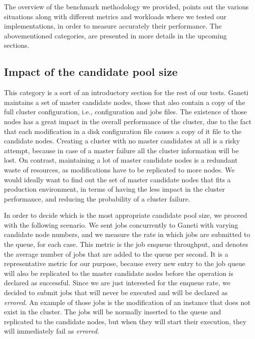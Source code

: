 The overview of the benchmark methodology we provided, points out the various
situations along with different metrics and workloads where we tested our
implementations, in order to measure accurately their performance. The
abovementioned categories, are presented in more details in the upcoming
sections.

\subsection{Impact of the candidate pool size}\label{subsec:cand_size}

This category is a sort of an introductory section for the rest of our tests.
Ganeti maintains a set of master candidate nodes, those that also contain a copy
of the full cluster configuration, i.e., configuration and jobs files. The
existence of those nodes has a great impact in the overall performance of the
cluster, due to the fact that each modification in a disk configuration file
causes a copy of it file to the candidate nodes. Creating a cluster with no
master candidates at all is a risky attempt, because in case of a master
failure all the cluster information will be lost. On contrast, maintaining a lot
of master candidate nodes is a redundant waste of resources, as modifications
have to be replicated to more nodes. We would ideally want to find out the set
of master candidate nodes that fits a production environment, in terms of having
the less impact in the cluster performance, and reducing the probability of a
cluster failure.

In order to decide which is the most appropriate candidate pool size, we
proceed with the following scenario. We sent jobs concurrently to Ganeti with
varying candidate node numbers, and we measure the rate in which jobs are
submitted to the queue, for each case.
This metric is the job enqueue throughput, and denotes the average number
of jobs that are added to the queue per second. It is a representative metric
for our purpose, because every new entry to the job queue will also be
replicated to the master candidate nodes before the operation is declared as
successful. Since we are just
interested for the enqueue rate, we decided to submit jobs that will
never be executed and will be declared as \emph{errored}. An example of those
jobs is the modification of an instance that does not exist in the cluster. The
jobs will be normally inserted to the queue and replicated to the candidate
nodes, but when they will start their execution, they will immediately fail as
\emph{errored}.

